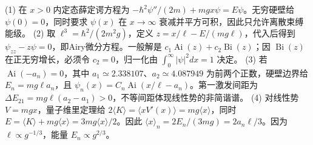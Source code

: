 (1) 在 \(x>0\) 内定态薛定谔方程为 \(-\hbar^2\psi''/(2m)+mgx\psi=E\psi\)。无穷硬壁给 \(\psi(0)=0\)，同时要求 \(\psi(x)\) 在 \(x\to\infty\) 衰减并平方可积，因此只允许离散束缚能级。
(2) 取 \(\ell^3=\hbar^2/(2m^2g)\)，定义 \(z=x/\ell-E/(mg\ell)\)，代入后得到 \(\psi_{zz}-z\psi=0\)，即Airy微分方程。一般解是 \(c_1\operatorname{Ai}(z)+c_2\operatorname{Bi}(z)\)；因 \(\operatorname{Bi}(z)\) 在正无穷增长，必须令 \(c_2=0\)，归一化由 \(\int_0^\infty|\psi|^2dx=1\) 决定。
(3) 若 \(\operatorname{Ai}(-a_n)=0\)，其中 \(a_1\simeq2.338107\)、\(a_2\simeq4.087949\) 为前两个正数，硬壁边界给 \(E_n=mg\ell a_n\)，且 \(\psi_n(x)=C_n\operatorname{Ai}(x/\ell-a_n)\)。第一激发间距为 \(\Delta E_{21}=mg\ell(a_2-a_1)>0\)，不等间距体现线性势的非简谐谱。
(4) 对线性势 \(V=mgx\)，量子维里定理给 \(2\langle K\rangle=\langle xV'(x)\rangle=mg\langle x\rangle\)，同时 \(E=\langle K\rangle+mg\langle x\rangle=3mg\langle x\rangle/2\)。因此 \(\langle x\rangle_n=2E_n/(3mg)=2a_n\ell/3\)。因为 \(\ell\propto g^{-1/3}\)，能量 \(E_n\propto g^{2/3}\)。
